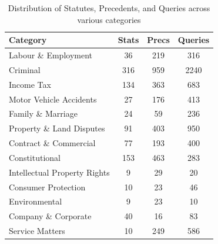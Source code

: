 \begin{table}[h]
    \centering
    \small
    \begin{tabular}{lccc}
        \hline
        \textbf{Category} & \textbf{Stats} & \textbf{Precs} & \textbf{Queries} \\
        \hline
        Labour \& Employment & 36  & 219 & 316  \\
        Criminal & 316 & 959 & 2240 \\
        Income Tax & 134 & 363 & 683 \\
        Motor Vehicle Accidents & 27  & 176 & 413  \\
        Family \& Marriage & 24  & 59  & 236  \\
        Property \& Land Disputes & 91  & 403 & 950  \\
        Contract \& Commercial & 77  & 193 & 400  \\
        Constitutional & 153 & 463 & 283  \\
        Intellectual Property Rights & 9   & 29  & 20   \\
        Consumer Protection & 10  & 23  & 46   \\
        Environmental & 9   & 23  & 10   \\
        Company \& Corporate & 40  & 16  & 83   \\
        Service Matters & 10  & 249 & 586  \\
        \hline
    \end{tabular}
    \caption{Distribution of Statutes, Precedents, and Queries across various categories}
    \label{tab:categories}
\end{table}






